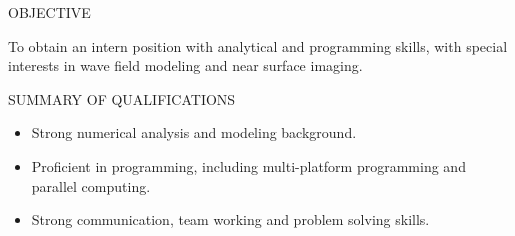 \documentclass{resume} %
\begin{document}
 
\begin{rSection}{OBJECTIVE} 

To obtain an intern position with analytical and programming skills, with special interests in wave field modeling and near surface imaging.
\end{rSection}


 
\begin{rSection}{SUMMARY OF QUALIFICATIONS}  
\begin{itemize}
\item Strong numerical analysis and modeling background.
\item Proficient in programming, including multi-platform programming and parallel computing. 
\item Strong communication, team working and problem solving skills.
\end{itemize}
\end{rSection}

\end{document}
